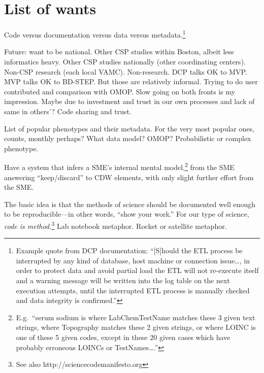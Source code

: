 \documentclass{tufte-handout}
\begin{document}
\section{List of wants}

Code versus documentation versus data versus
metadata.\footnote{Example quote from DCP documentation: ``[S]hould
  the ETL process be interrupted by any kind of database, host machine
  or connection issue\ldots{}, in order to protect data and avoid
  partial load the ETL will not re-execute itself and a warning
  message will be written into the log table on the next execution
  attempts, until the interrupted ETL process is manually checked and
  data integrity is confirmed.''}

Future: want to be national. Other CSP studies within Boston, albeit
less informatics heavy. Other CSP studies nationally (other
coordinating centers). Non-CSP research (each local VAMC).
Non-research. DCP talks OK to MVP. MVP talks OK to BD-STEP. But those
are relatively informal. Trying to do user contributed and comparison
with OMOP. Slow going on both fronts is my impression. Maybe due to
investment and trust in our own processes and lack of same in others'?
Code sharing and trust. 


List of popular phenotypes and their metadata. For the very most
popular ones, counts, monthly perhaps? What data model? OMOP?
Probabilistic or complex phenotype.

Have a system that infers a SME's internal mental
model,\footnote{E.g.\ ``serum sodium is where LabChemTestName matches
  these 3 given text strings, where Topography matches these 2 given
  strings, or where LOINC is one of these 5 given codes, except in
  these 20 given cases which have probably erroneous LOINCs or
  TestNames\ldots{}.''} from the SME answering ``keep/discard'' to CDW
elements, with only slight further effort from the SME.

The basic idea is that the methods of science should be documented
well enough to be reproducible---in other words, ``show your work.''
For our type of science, \emph{code is method.}\footnote{See also
http://sciencecodemanifesto.org} Lab notebook metaphor. Rocket or
satellite metaphor.

\end{document}

